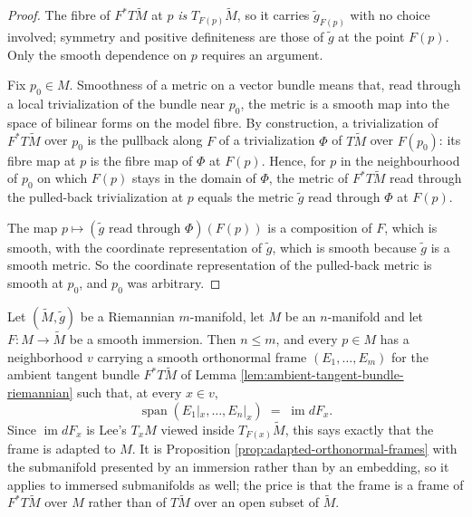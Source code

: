 \begin{proof}
\leanok
{}
The fibre of $F^* T\tilde M$ at $p$ \emph{is} $T_{F(p)}\tilde M$, so it carries $\tilde g_{F(p)}$ with no choice involved; symmetry and positive definiteness are those of $\tilde g$ at the point $F(p)$. Only the smooth dependence on $p$ requires an argument.

Fix $p_0 \in M$. Smoothness of a metric on a vector bundle means that, read through a local trivialization of the bundle near $p_0$, the metric is a smooth map into the space of bilinear forms on the model fibre. By construction, a trivialization of $F^* T\tilde M$ over $p_0$ is the pullback along $F$ of a trivialization $\Phi$ of $T\tilde M$ over $F(p_0)$: its fibre map at $p$ is the fibre map of $\Phi$ at $F(p)$. Hence, for $p$ in the neighbourhood of $p_0$ on which $F(p)$ stays in the domain of $\Phi$, the metric of $F^* T\tilde M$ read through the pulled-back trivialization at $p$ equals the metric $\tilde g$ read through $\Phi$ at $F(p)$.

The map $p \mapsto (\tilde g \text{ read through } \Phi)(F(p))$ is a composition of $F$, which is smooth, with the coordinate representation of $\tilde g$, which is smooth because $\tilde g$ is a smooth metric. So the coordinate representation of the pulled-back metric is smooth at $p_0$, and $p_0$ was arbitrary.
\end{proof}

\begin{proposition}
\label{prop:adapted-orthonormal-frames-immersed}
\leanok
{}
Let $(\tilde M, \tilde g)$ be a Riemannian $m$-manifold, let $M$ be an $n$-manifold and let
$F : M \to \tilde M$ be a smooth immersion. Then $n \le m$, and every $p \in M$ has a
neighborhood $v$ carrying a smooth orthonormal frame $(E_1, \ldots, E_m)$ for the ambient
tangent bundle $F^* T\tilde M$ of Lemma \ref{lem:ambient-tangent-bundle-riemannian} such that,
at every $x \in v$,
\[
  \operatorname{span}(E_1|_x, \ldots, E_n|_x) \;=\; \operatorname{im} dF_x .
\]
Since $\operatorname{im} dF_x$ is Lee's $T_x M$ viewed inside $T_{F(x)}\tilde M$, this says
exactly that the frame is adapted to $M$. It is Proposition \ref{prop:adapted-orthonormal-frames}
with the submanifold presented by an immersion rather than by an embedding, so it applies to
immersed submanifolds as well; the price is that the frame is a frame of $F^* T\tilde M$ over
$M$ rather than of $T\tilde M$ over an open subset of $\tilde M$.
\end{proposition}

